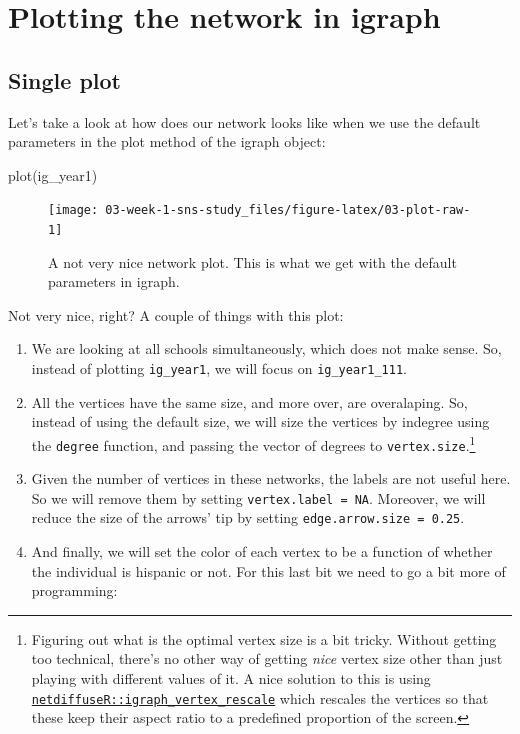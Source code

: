 \documentclass[
]{book}
\newenvironment{Shaded}{\begin{snugshade}}{\end{snugshade}}
\newcommand{\FunctionTok}[1]{\textcolor[rgb]{0.00,0.00,0.00}{#1}}
\newcommand{\NormalTok}[1]{#1}
\begin{document}
\hypertarget{plotting-the-network-in-igraph}{%
\section{Plotting the network in igraph}\label{plotting-the-network-in-igraph}}

\hypertarget{single-plot}{%
\subsection{Single plot}\label{single-plot}}

Let's take a look at how does our network looks like when we use the default parameters in the plot method of the igraph object:

\begin{Shaded}
\begin{Highlighting}[]
\FunctionTok{plot}\NormalTok{(ig\_year1)}
\end{Highlighting}
\end{Shaded}

\begin{figure}

{\centering \texttt{[image: 03-week-1-sns-study\_files/figure-latex/03-plot-raw-1]} 

}

\caption{A not very nice network plot. This is what we get with the default parameters in igraph.}\label{fig:03-plot-raw}
\end{figure}

Not very nice, right? A couple of things with this plot:

\begin{enumerate}
\def\labelenumi{\arabic{enumi}.}
\item
  We are looking at all schools simultaneously, which does not make sense. So, instead of plotting \texttt{ig\_year1}, we will focus on \texttt{ig\_year1\_111}.
\item
  All the vertices have the same size, and more over, are overalaping. So, instead of using the default size, we will size the vertices by indegree using the \texttt{degree} function, and passing the vector of degrees to \texttt{vertex.size}.\footnote{Figuring out what is the optimal vertex size is a bit tricky. Without getting too technical, there's no other way of getting \emph{nice} vertex size other than just playing with different values of it. A nice solution to this is using \href{https://www.rdocumentation.org/packages/netdiffuseR/versions/1.17.0/topics/rescale_vertex_igraph}{\texttt{netdiffuseR::igraph\_vertex\_rescale}} which rescales the vertices so that these keep their aspect ratio to a predefined proportion of the screen.}
\item
  Given the number of vertices in these networks, the labels are not useful here. So we will remove them by setting \texttt{vertex.label\ =\ NA}. Moreover, we will reduce the size of the arrows' tip by setting \texttt{edge.arrow.size\ =\ 0.25}.
\item
  And finally, we will set the color of each vertex to be a function of whether the individual is hispanic or not. For this last bit we need to go a bit more of programming:
\end{enumerate}
\end{document}
